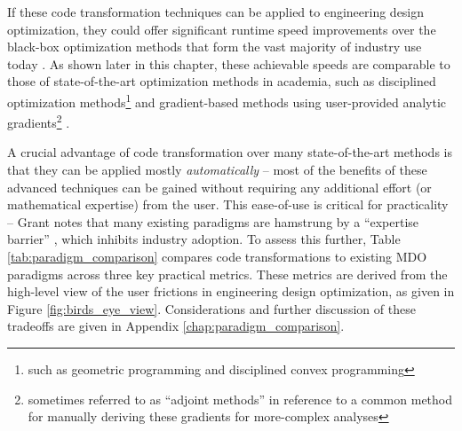 If these code transformation techniques can be applied to engineering design optimization, they could offer significant runtime speed improvements over the black-box optimization methods that form the vast majority of industry use today \cite{martins_engineering_2021, lavin_simulation_2022}. As shown later in this chapter, these achievable speeds are comparable to those of state-of-the-art optimization methods in academia, such as disciplined optimization methods\footnote{such as geometric programming and disciplined convex programming} \cite{grant_disciplined_2006, gpkit, boyd_convex_2004, agrawal_disciplined_2019} and gradient-based methods using user-provided analytic gradients\footnote{sometimes referred to as ``adjoint methods'' in reference to a common method for manually deriving these gradients for more-complex analyses} \cite{gray_openmdao_2019, kenway_effective_2019, innes_don_2019}.

A crucial advantage of code transformation over many state-of-the-art methods is that they can be applied mostly \textit{automatically} -- most of the benefits of these advanced techniques can be gained without requiring any additional effort (or mathematical expertise) from the user. This ease-of-use is critical for practicality -- Grant notes that many existing paradigms are hamstrung by a ``expertise barrier'' \cite{grant_disciplined_2006}, which inhibits industry adoption. To assess this further, Table \ref{tab:paradigm_comparison} compares code transformations to existing MDO paradigms across three key practical metrics. These metrics are derived from the high-level view of the user frictions in engineering design optimization, as given in Figure \ref{fig:birds_eye_view}. Considerations and further discussion of these tradeoffs are given in Appendix \ref{chap:paradigm_comparison}.

